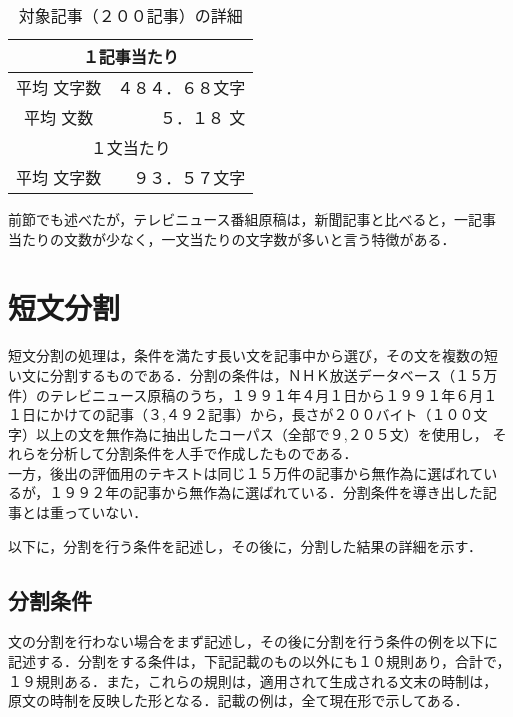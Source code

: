 \renewcommand{\arraystretch}{}
\begin{table}[h]
\begin{center}
\begin{tabular}{|c|r|} \hline
\multicolumn{2}{|c|}{１記事当たり} \\ \hline
平均 文字数     & ４８４．６８文字 \\ \hline
平均 文数       & ５．１８  文 \\ \hline
\multicolumn{2}{|c|}{１文当たり} \\ \hline
平均 文字数     & ９３．５７文字 \\ \hline
\end{tabular}
\end{center}
\caption{対象記事（２００記事）の詳細}
\end{table}

前節でも述べたが，テレビニュース番組原稿は，新聞記事と比べると，一記事
当たりの文数が少なく，一文当たりの文字数が多いと言う特徴がある．


\section{短文分割}
短文分割の処理は，条件を満たす長い文を記事中から選び，その文を複数の短
い文に分割するものである．分割の条件は，ＮＨＫ放送データベース（１５万
件）のテレビニュース原稿のうち，１９９１年４月１日から１９９１年６月１
１日にかけての記事（３,４９２記事）から，長さが２００バイト（１００文
字）以上の文を無作為に抽出したコーパス（全部で９,２０５文）を使用し，
それらを分析して分割条件を人手で作成したものである．\\
一方，後出の評価用のテキストは同じ１５万件の記事から無作為に選ばれてい
るが，１９９２年の記事から無作為に選ばれている．分割条件を導き出した記
事とは重っていない．

以下に，分割を行う条件を記述し，その後に，分割した結果の詳細を示す．

\subsection{分割条件}
文の分割を行わない場合をまず記述し，その後に分割を行う条件の例を以下に
記述する．分割をする条件は，下記記載のもの以外にも１０規則あり，合計で，
１９規則ある．また，これらの規則は，適用されて生成される文末の時制は，
原文の時制を反映した形となる．記載の例は，全て現在形で示してある．

